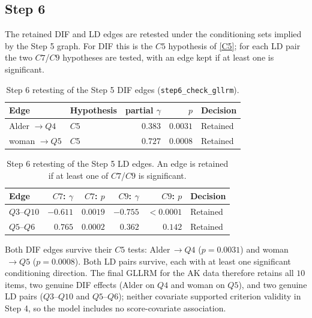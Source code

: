 \subsection{Step 6}
The retained DIF and LD edges are retested under the conditioning sets implied by the Step 5 graph. For DIF this is the $C5$ hypothesis of \eqref{C5}; for each LD pair the two $C7$/$C9$ hypotheses are tested, with an edge kept if at least one is significant.
\begin{table}[H]
\centering
\begin{tabular}{@{}llrrl@{}}
\toprule
Edge & Hypothesis & partial $\gamma$ & $p$ & Decision \\
\midrule
Alder $\to Q4$ & $C5$ & $0.383$ & $0.0031$ & Retained \\
woman $\to Q5$ & $C5$ & $0.727$ & $0.0008$ & Retained \\
\bottomrule
\end{tabular}
\caption{Step 6 retesting of the Step 5 DIF edges (\texttt{step6\_check\_gllrm}).}
\label{tab:ak_step6_dif}
\end{table}
\begin{table}[H]
\centering
\begin{tabular}{@{}lrrrrl@{}}
\toprule
Edge & $C7$: $\gamma$ & $C7$: $p$ & $C9$: $\gamma$ & $C9$: $p$ & Decision \\
\midrule
$Q3$--$Q10$ & $-0.611$ & $0.0019$ & $-0.755$ & $<0.0001$ & Retained \\
$Q5$--$Q6$  & $0.765$  & $0.0002$  & $0.362$  & $0.142$  & Retained \\
\bottomrule
\end{tabular}
\caption{Step 6 retesting of the Step 5 LD edges. An edge is retained if at least one of $C7$/$C9$ is significant.}
\label{tab:ak_step6_ld}
\end{table}
Both DIF edges survive their $C5$ tests: Alder$\,\to Q4$ ($p=0.0031$) and woman$\,\to Q5$ ($p=0.0008$). Both LD pairs survive, each with at least one significant conditioning direction. The final GLLRM for the AK data therefore retains all $10$ items, two genuine DIF effects (Alder on $Q4$ and woman on $Q5$), and two genuine LD pairs ($Q3$--$Q10$ and $Q5$--$Q6$); neither covariate supported criterion validity in Step 4, so the model includes no score-covariate association.

